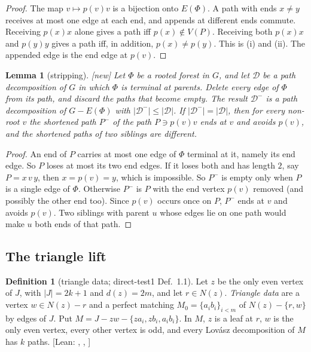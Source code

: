\documentclass[11pt]{amsart}
\newtheorem{lemma}[theorem]{Lemma}
\theoremstyle{definition}
\newtheorem{definition}[theorem]{Definition}
\newcommand{\st}[1]{\textsf{\small[#1]}}
\newcommand{\cD}{\mathcal D}
\begin{document}
\begin{proof}
The map $v\mapsto p(v)v$ is a bijection onto $E(\Phi)$. A path with ends $x\ne y$ receives at most one
edge at each end, and appends at different ends commute. Receiving $p(x)x$ alone gives a path iff
$p(x)\notin V(P)$. Receiving both $p(x)x$ and $p(y)y$ gives a path iff, in addition, $p(x)\ne p(y)$.
This is (i) and (ii). The appended edge is the end edge at $p(v)$.
\end{proof}

\begin{lemma}[stripping]\label{lem:strip} \st{new}
Let $\Phi$ be a rooted forest in $G$, and let $\cD$ be a path decomposition of $G$ in which $\Phi$ is
terminal at parents. Delete every edge of $\Phi$ from its path, and discard the paths that become empty.
The result $\cD^-$ is a path decomposition of $G-E(\Phi)$ with $|\cD^-|\le|\cD|$. If $|\cD^-|=|\cD|$,
then for every non-root $v$ the shortened path $P^-$ of the path $P\ni p(v)v$ ends at $v$ and avoids
$p(v)$, and the shortened paths of two siblings are different.
\end{lemma}

\begin{proof}
An end of $P$ carries at most one edge of $\Phi$ terminal at it, namely its end edge. So $P$ loses at
most its two end edges. If it loses both and has length $2$, say $P=x\,v\,y$, then $x=p(v)=y$, which is
impossible. So $P^-$ is empty only when $P$ is a single edge of $\Phi$. Otherwise $P^-$ is $P$ with the end
vertex $p(v)$ removed (and possibly the other end too). Since $p(v)$ occurs once on $P$, $P^-$ ends at
$v$ and avoids $p(v)$. Two siblings with parent $u$ whose edges lie on one path would make $u$ both ends
of that path.
\end{proof}

\subsection{The triangle lift}

\begin{definition}[triangle data; direct-test1 Def.~1.1]\label{def:tri}
Let $z$ be the only even vertex of $J$, with $|J|=2k+1$ and $d(z)=2m$, and let $r\in N(z)$.
\emph{Triangle data} are a vertex $w\in N(z)-r$ and a perfect matching $M_0=\{a_ib_i\}_{i<m}$ of
$N(z)-\{r,w\}$ by edges of $J$. Put $M=J-zw-\{za_i,zb_i,a_ib_i\}$. In $M$, $z$ is a leaf at $r$, $w$ is
the only even vertex, every other vertex is odd, and every Lov\'asz decomposition of $M$ has $k$ paths.
\st{Lean: , , }
\end{definition}
\end{document}
